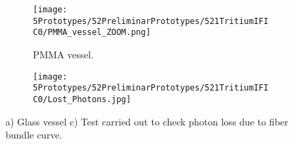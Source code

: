 \begin{figure}
\centering
    \begin{subfigure}[b]{0.45\textwidth}
    \centering
    \texttt{[image: 5Prototypes/52PreliminarPrototypes/521TritiumIFIC0/PMMA\_vessel\_ZOOM.png]}  
    \caption{PMMA vessel.\label{subfig:PMMAVesselToTestLostPhotons}}
    \end{subfigure}
    \hfill
    \begin{subfigure}[b]{0.45\textwidth}
    \centering
    \texttt{[image: 5Prototypes/52PreliminarPrototypes/521TritiumIFIC0/Lost\_Photons.jpg]}  
    \caption{\label{subfig:TestLostPhotons}}
    \end{subfigure}
 \caption{a) Glass vessel c) Test carried out to check photon loss due to fiber bundle curve.}
 \label{fig:TestLostPhotons}
\end{figure}










